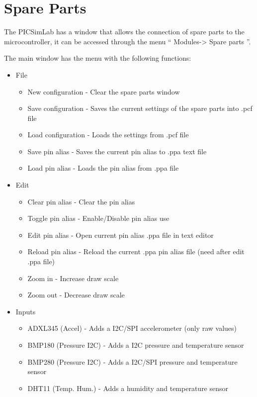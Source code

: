 

\chapter{Spare Parts} \hypertarget{def:spare}{}

The PICSimLab has a window that allows the connection of spare parts to the microcontroller, it can be accessed through the menu `` Modules-> Spare parts ''.

The main window has the menu with the following functions:
\begin{itemize}
 \item File
 \begin{itemize}
 \item New configuration - Clear the spare parts window 
 \item Save configuration - Saves the current settings of the spare parts into .pcf file
 \item Load configuration - Loads the settings from .pcf file
 \item Save pin alias - Saves the current pin alias to .ppa text file
 \item Load pin alias - Loads the pin alias from .ppa file
\end{itemize}
 \item Edit
 \begin{itemize}
 \item Clear pin alias - Clear the pin alias 
 \item Toggle pin alias - Enable/Disable pin alias use
 \item Edit pin alias - Open current pin alias .ppa file in text editor
 \item Reload pin alias - Reload the current .ppa pin alias file (need after edit .ppa file) 
 \item Zoom in - Increase draw scale
 \item Zoom out - Decrease draw scale
\end{itemize}
 \item Inputs
 \begin{itemize}
  \item ADXL345 (Accel) - Adds a I2C/SPI accelerometer (only raw values)
  \item BMP180 (Pressure I2C) - Adds a I2C pressure and temperature sensor
  \item BMP280 (Pressure I2C) - Adds a I2C/SPI pressure and temperature sensor
  \item DHT11 (Temp. Hum.) - Adds a humidity and temperature sensor

\end{itemize}
\end{itemize}
